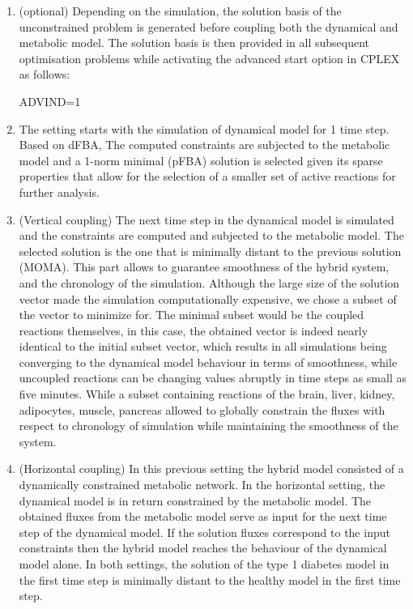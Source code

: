 \begin{enumerate}
\item	(optional) Depending on the simulation, the solution basis of the unconstrained problem is generated before coupling both the dynamical and metabolic model. The solution basis is then provided in all subsequent optimisation problems while activating the advanced start option in CPLEX as follows:\\
\begin{center}
ADVIND=1
\end{center}
\item	The setting starts with the simulation of dynamical model for 1 time step. Based on dFBA, The computed constraints are subjected to the metabolic model and a 1-norm minimal (pFBA) solution is selected given its sparse properties that allow for the selection of a smaller set of active reactions for further analysis.
\item	(Vertical coupling) The next time step in the dynamical model is simulated and the constraints are computed and subjected to the metabolic model. The selected solution is the one that is minimally distant to the previous solution (MOMA). This part allows to guarantee smoothness of the hybrid system, and the chronology of the simulation. Although the large size of the solution vector made the simulation computationally expensive, we chose a subset of the vector to minimize for. The minimal subset would be the coupled reactions themselves, in this case, the obtained vector is indeed nearly identical to the initial subset vector, which results in all simulations being converging to the dynamical model behaviour in terms of smoothness, while uncoupled reactions can be changing values abruptly in time steps as small as five minutes. While a subset containing reactions of the brain, liver, kidney, adipocytes, muscle, pancreas allowed to globally constrain the fluxes with respect to chronology of simulation while maintaining the smoothness of the system.
\item	(Horizontal coupling) In this previous setting the hybrid model consisted of a dynamically constrained metabolic network. In the horizontal setting, the dynamical model is in return constrained by the metabolic model. The obtained fluxes from the metabolic model serve as input for the next time step of the dynamical model. If the solution fluxes correspond to the input constraints then the hybrid model reaches the behaviour of the dynamical model alone. In both settings, the solution of the type 1 diabetes model in the first time step is minimally distant to the healthy model in the first time step.
\end{enumerate}
